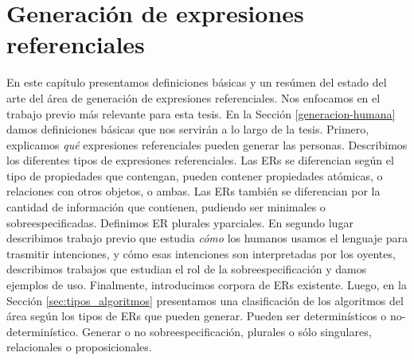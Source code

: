 \chapter{Generaci\'on de expresiones referenciales}
\label{sec:seleccion}

En este cap\'itulo presentamos definiciones b\'asicas y un res\'umen del estado del arte del \'area de generaci\'on de expresiones referenciales. Nos enfocamos en el trabajo previo m\'as relevante para esta tesis. 
En la Secci\'on \ref{generacion-humana} damos definiciones b\'asicas que nos servir\'an a 
lo largo de la tesis. Primero, explicamos \emph{qu\'e} expresiones referenciales pueden generar las personas. Describimos los diferentes tipos de expresiones referenciales. Las ERs se diferencian seg\'un el tipo de propiedades que 
contengan, pueden contener propiedades at\'omicas, o relaciones con otros objetos, o ambas. Las ERs tambi\'en se diferencian por la cantidad de informaci\'on que contienen, pudiendo ser minimales o sobreespecificadas. Definimos ER plurales yparciales. %
En segundo lugar describimos trabajo previo que estudia \emph{c\'omo} los humanos usamos el lenguaje para trasmitir intenciones, y c\'omo esas intenciones son interpretadas por los oyentes, describimos trabajos que estudian el rol de la sobreespecificaci\'on y damos ejemplos de uso. Finalmente, introducimos corpora de ERs existente. Luego, en la Secci\'on \ref{sec:tipos_algoritmos} presentamos una clasificaci\'on de los algoritmos del \'area seg\'un los tipos de ERs que pueden generar. Pueden ser determin\'isticos o no-determin\'istico. Generar o no sobreespecificaci\'on, plurales o s\'olo singulares, relacionales o proposicionales.
